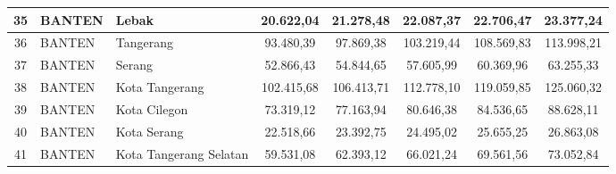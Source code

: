 \begin{spacing}{1.0}
\begin{longtable}{|c|p{2.2cm}|p{2.8cm}|c|c|c|c|c|}
35 & BANTEN & Lebak & 20.622,04 & 21.278,48 & 22.087,37 & 22.706,47 & 23.377,24 \\ \hline
36 & BANTEN & Tangerang & 93.480,39 & 97.869,38 & 103.219,44 & 108.569,83 & 113.998,21 \\ \hline
37 & BANTEN & Serang & 52.866,43 & 54.844,65 & 57.605,99 & 60.369,96 & 63.255,33 \\ \hline
38 & BANTEN & Kota Tangerang & 102.415,68 & 106.413,71 & 112.778,10 & 119.059,85 & 125.060,32 \\ \hline
39 & BANTEN & Kota Cilegon & 73.319,12 & 77.163,94 & 80.646,38 & 84.536,65 & 88.628,11 \\ \hline
40 & BANTEN & Kota Serang & 22.518,66 & 23.392,75 & 24.495,02 & 25.655,25 & 26.863,08 \\ \hline
41 & BANTEN & Kota Tangerang Selatan & 59.531,08 & 62.393,12 & 66.021,24 & 69.561,56 & 73.052,84 \\ \hline
\end{longtable}
\end{spacing}
\newpage
